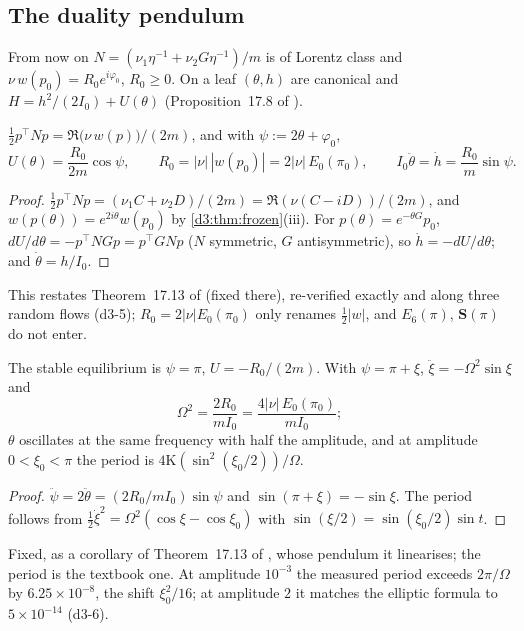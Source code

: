 \subsection{The duality pendulum}
\label{d3:sec:pendulum}

From now on $N=(\nu_1\eta^{-1}+\nu_2G\eta^{-1})/m$ is of Lorentz class and $\nu\,w(p_0)=R_0e^{i\varphi_0}$, $R_0\ge0$. On a leaf $(\theta,h)$ are
canonical and $H=h^2/(2I_0)+U(\theta)$ (Proposition~17.8 of \cite{ES17}).

\begin{proposition}
\label{d3:prop:pendulum}
$\tfrac12p^{\!\top}Np=\Re\bigl(\nu\,w(p)\bigr)/(2m)$, and with $\psi:=2\theta+\varphi_0$,
\[
U(\theta)=\frac{R_0}{2m}\cos\psi,\qquad R_0=|\nu|\,|w(p_0)|=2|\nu|\,E_0(\pi_0),\qquad I_0\ddot\theta=\dot h=\frac{R_0}m\sin\psi .
\]
\end{proposition}

\begin{proof}
$\tfrac12p^{\!\top}Np=(\nu_1C+\nu_2D)/(2m)=\Re(\nu(C-iD))/(2m)$, and $w(p(\theta))=e^{2i\theta}w(p_0)$ by \cref{d3:thm:frozen}(iii). For
$p(\theta)=e^{-\theta G}p_0$, $dU/d\theta=-p^{\!\top}NGp=p^{\!\top}GNp$ ($N$ symmetric, $G$ antisymmetric), so $\dot h=-dU/d\theta$; and $\dot\theta=h/I_0$.
\end{proof}

This restates Theorem~17.13 of \cite{ES17} (fixed there), re-verified exactly and along three random flows (d3-5); $R_0=2|\nu|E_0(\pi_0)$ only renames
$\tfrac12|w|$, and $E_6(\pi)$, $\mathbf S(\pi)$ do not enter.

\begin{proposition}
\label{d3:prop:omega}
The stable equilibrium is $\psi=\pi$, $U=-R_0/(2m)$. With $\psi=\pi+\xi$, $\ddot\xi=-\Omega^2\sin\xi$ and
\[
\Omega^2=\frac{2R_0}{mI_0}=\frac{4|\nu|\,E_0(\pi_0)}{mI_0};
\]
$\theta$ oscillates at the same frequency with half the amplitude, and at amplitude $0<\xi_0<\pi$ the period is $4\mathrm K(\sin^2(\xi_0/2))/\Omega$.
\end{proposition}

\begin{proof}
$\ddot\psi=2\ddot\theta=(2R_0/mI_0)\sin\psi$ and $\sin(\pi+\xi)=-\sin\xi$. The period follows from $\tfrac12\dot\xi^2=\Omega^2(\cos\xi-\cos\xi_0)$ with
$\sin(\xi/2)=\sin(\xi_0/2)\sin t$.
\end{proof}

Fixed, as a corollary of Theorem~17.13 of \cite{ES17}, whose pendulum it linearises; the period is the textbook one. At amplitude $10^{-3}$ the
measured period exceeds $2\pi/\Omega$ by $6.25\times10^{-8}$, the shift $\xi_0^2/16$; at amplitude $2$ it matches the elliptic formula to
$5\times10^{-14}$ (d3-6).

